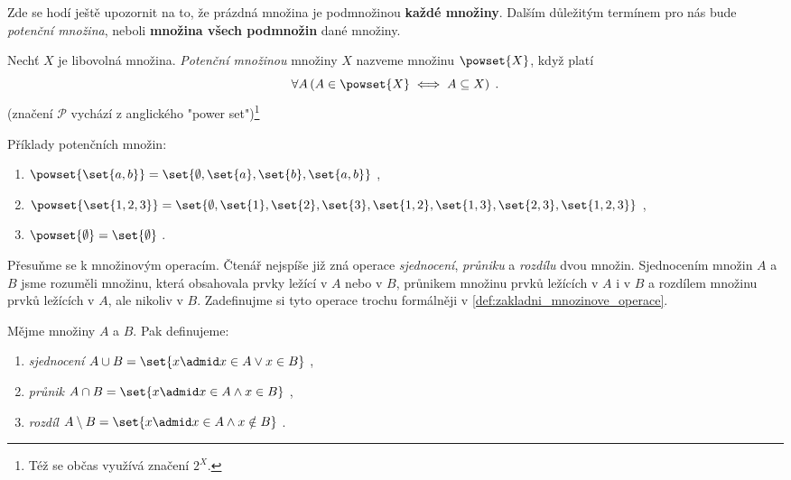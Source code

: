 Zde se hodí ještě upozornit na to, že prázdná množina je podmnožinou \textbf{každé množiny}. Dalším důležitým termínem pro nás bude \emph{potenční množina}, neboli \textbf{množina všech podmnožin} dané množiny.
\begin{definition}\label{def:potence}
    Nechť $X$ je libovolná množina. \emph{Potenční množinou} množiny $X$ nazveme množinu $\powset{X}$, když platí
    \begin{equation*}
        \forall A \left(A \in \powset{X} \iff A \subseteq X\right)\; .
    \end{equation*}
    (značení $\mathcal{P}$ vychází z anglického "power set")\footnote{Též se občas využívá značení $2^{X}$.}
\end{definition} 
\begin{example}
    Příklady potenčních množin:
    \begin{enumerate}[label=(\roman*)]
        \item $\powset{\set{a,b}}=\set{\emptyset,\set{a},\set{b},\set{a,b}}$ ,
        \item $\powset{\set{1,2,3}}=\set{\emptyset,\set{1},\set{2},\set{3},\set{1,2},\set{1,3},\set{2,3},\set{1,2,3}}$ ,
        \item $\powset{\emptyset}=\set{\emptyset}$ .
    \end{enumerate}
\end{example}

Přesuňme se k množinovým operacím. Čtenář nejspíše již zná operace \emph{sjednocení}, \emph{průniku} a \emph{rozdílu} dvou množin. Sjednocením množin $A$ a $B$ jsme rozuměli množinu, která obsahovala prvky ležící v $A$ nebo v $B$, průnikem množinu prvků ležících v $A$ i v $B$ a rozdílem množinu prvků ležících v $A$, ale nikoliv v $B$. Zadefinujme si tyto operace trochu formálněji v \ref{def:zakladni_mnozinove_operace}. 
\begin{definition}\label{def:zakladni_mnozinove_operace}
    Mějme množiny $A$ a $B$. Pak definujeme:
    \begin{enumerate}[label=(\roman*)]
        \item \emph{sjednocení} $A \cup B=\set{x \admid x \in A \lor x \in B}$ ,
        \item \emph{průnik} $A \cap B=\set{x \admid x \in A \land x \in B}$ ,
        \item \emph{rozdíl} $A \setminus B=\set{x \admid x \in A \land x \notin B}$ .
    \end{enumerate}
\end{definition}

